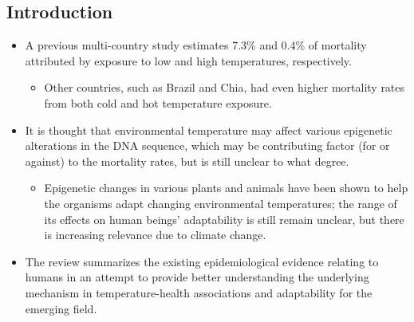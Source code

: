 \documentclass[basic]{inVerba-notes}
\begin{document}
\begin{itemize}
  \subsection{Introduction}
  \begin{itemize}
      \item A previous multi-country study estimates 7.3\% and 0.4\% of mortality attributed by exposure to low and high temperatures, respectively.
        \begin{itemize}
          \item Other countries, such as Brazil and Chia, had even higher mortality rates from both cold and hot temperature exposure.
        \end{itemize}
      \item It is thought that environmental temperature may affect various epigenetic alterations in the DNA sequence, which may be contributing factor (for or against) to the  mortality rates, but is still unclear to what degree.
        \begin{itemize}
          \item Epigenetic changes in various plants and animals have been shown to help the organisms adapt changing environmental temperatures; the range of its effects on human beings' adaptability is still remain unclear, but there is increasing relevance due to climate change.
        \end{itemize}
      \item The review summarizes the existing epidemiological evidence relating to humans in an attempt to provide better understanding the underlying mechanism in temperature-health associations and adaptability for the emerging field.
  \end{itemize}
  

\end{itemize}
\end{document}
